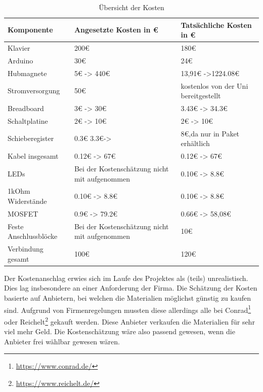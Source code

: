 \begin{table}[htbp]
    \centering
    \begin{tabular}{|m{3.8cm}|m{5cm}|m{5cm}|}
        \hline
        \textbf{Komponente} &  \textbf{Angesetzte Kosten in \euro{}} & \textbf{Tatsächliche Kosten in \euro{}}  \\
        \hline
        Klavier & 200\euro{} & 180\euro{} \\
        \hline
        Arduino & 30\euro{} & 24\euro{} \\
        \hline
        Hubmagnete & 5\euro{} -> 440\euro{} & 13,91\euro{} ->1224.08\euro{} \\
        \hline
        Stromversorgung & 50\euro{} & kostenlos von der Uni bereitgestellt \\
        \hline
        Breadboard & 3\euro{} -> 30\euro{} & 3.43\euro{} -> 34.3\euro{} \\
        \hline
        Schaltplatine & 2\euro{} -> 10\euro{} & 2\euro{} -> 10\euro{}\\
        \hline
        Schieberegister & 0.3\euro{} 3.3\euro{}->  & 8\euro{},da nur in Paket erhältlich\\
        \hline
        Kabel insgesamt & 0.12\euro{}  -> 67\euro{} & 0.12\euro{}  -> 67\euro{}\\
        \hline
        LEDs & Bei der Kostenschätzung nicht mit aufgenommen & 0.10\euro{} -> 8.8\euro{} \\
        \hline
        1kOhm Widerstände & 0.10\euro{} -> 8.8\euro{} & 0.10\euro{} -> 8.8\euro{} \\
        \hline
        MOSFET & 0.9\euro{} -> 79.2\euro{} & 0.66\euro{} -> 58,08\euro{} \\
        \hline
        Feste Anschlussblöcke & Bei der Kostenschätzung nicht mit aufgenommen  & 10\euro{}\\
        \hline
        Verbindung gesamt & 100\euro{} & 120\euro{} \\
        \hline
    \end{tabular}
    \caption{Übersicht der Kosten}
    \label{table:kosten}
\end{table}

Der Kostenanschlag erwies sich im Laufe des Projektes als (teils) unrealistisch. Dies lag insbesondere an einer Anforderung der Firma.
Die Schätzung der Kosten basierte auf Anbietern, bei welchen die Materialien möglichst günstig zu kaufen sind.
Aufgrund von Firmenregelungen mussten diese allerdings alle bei Conrad\footnote{\url{https://www.conrad.de/}} oder Reichelt\footnote{\url{https://www.reichelt.de/}} gekauft werden.
Diese Anbieter verkaufen die Materialien für sehr viel mehr Geld.
Die Kostenschätzung wäre also passend gewesen, wenn die Anbieter frei wählbar gewesen wären.


